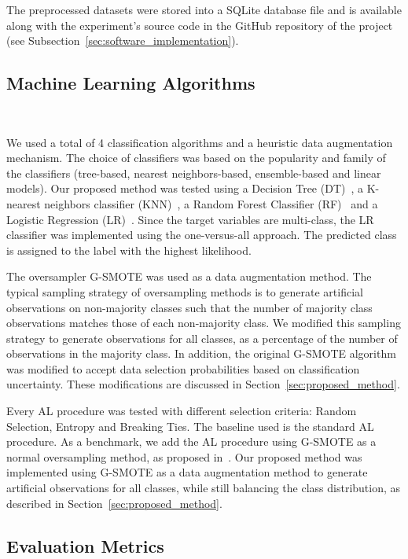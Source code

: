 \documentclass[parskip=full]{scrartcl}
\begin{document}
The preprocessed datasets were stored into a SQLite database file and is
available along with the experiment's source code in the GitHub repository of
the project (see Subsection~\ref{sec:software_implementation}).

\subsection{Machine Learning Algorithms}~\label{sec:machine_learning_algorithms}

We used a total of 4 classification algorithms and a heuristic data
augmentation mechanism. The choice of classifiers was based on the popularity
and family of the classifiers (tree-based, nearest neighbors-based,
ensemble-based and linear models). Our proposed method was tested using a
Decision Tree (DT)~\cite{Wu1975}, a K-nearest neighbors classifier
(KNN)~\cite{Cover1967}, a Random Forest Classifier (RF)~\cite{Ho1995} and a
Logistic Regression (LR)~\cite{Nelder1972}. Since the target variables are
multi-class, the LR classifier was implemented using the one-versus-all
approach. The predicted class is assigned to the label with the highest
likelihood.

The oversampler G-SMOTE was used as a data augmentation method. The typical
sampling strategy of oversampling methods is to generate artificial
observations on non-majority classes such that the number of majority class
observations matches those of each non-majority class. We modified this
sampling strategy to generate observations for all classes, as a percentage of
the number of observations in the majority class. In addition, the original
G-SMOTE algorithm was modified to accept data selection probabilities based on
classification uncertainty. These modifications are discussed in
Section~\ref{sec:proposed_method}.

Every AL procedure was tested with different selection criteria: Random
Selection, Entropy and Breaking Ties. The baseline used is the standard AL
procedure. As a benchmark, we add the AL procedure using G-SMOTE as a normal
oversampling method, as proposed in~\cite{Fonseca2021}. Our proposed method
was implemented using G-SMOTE as a data augmentation method to generate
artificial observations for all classes, while still balancing the class
distribution, as described in Section~\ref{sec:proposed_method}. 

\subsection{Evaluation Metrics}~\label{sec:evaluation_metrics}
\end{document}

